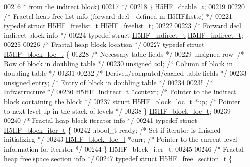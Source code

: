 \begin{DoxyCode}
00216 \textcolor{comment}{                                     * from the indirect block)}
00217 \textcolor{comment}{                                     */}
00218 \} \hyperlink{struct_h5_h_f__dtable__t}{H5HF\_dtable\_t};
00219 
00220 \textcolor{comment}{/* Fractal heap free list info (forward decl - defined in H5HFflist.c) */}
00221 \textcolor{keyword}{typedef} \textcolor{keyword}{struct }H5HF\_freelist\_t H5HF\_freelist\_t;
00222 
00223 \textcolor{comment}{/* Forward decl indirect block info */}
00224 \textcolor{keyword}{typedef} \textcolor{keyword}{struct }\hyperlink{struct_h5_h_f__indirect__t}{H5HF\_indirect\_t} \hyperlink{struct_h5_h_f__indirect__t}{H5HF\_indirect\_t};
00225 
00226 \textcolor{comment}{/* Fractal heap block location */}
00227 \textcolor{keyword}{typedef} \textcolor{keyword}{struct }\hyperlink{struct_h5_h_f__block__loc__t}{H5HF\_block\_loc\_t} \{
00228     \textcolor{comment}{/* Necessary table fields */}
00229     \textcolor{keywordtype}{unsigned}    row;            \textcolor{comment}{/* Row of block in doubling table             */}
00230     \textcolor{keywordtype}{unsigned}    col;            \textcolor{comment}{/* Column of block in doubling table          */}
00231 
00232     \textcolor{comment}{/* Derived/computed/cached table fields */}
00233     \textcolor{keywordtype}{unsigned}    entry;          \textcolor{comment}{/* Entry of block in doubling table           */}
00234 
00235     \textcolor{comment}{/* Infrastructure */}
00236     \hyperlink{struct_h5_h_f__indirect__t}{H5HF\_indirect\_t} *context;   \textcolor{comment}{/* Pointer to the indirect block containing the block */}
00237     \textcolor{keyword}{struct }\hyperlink{struct_h5_h_f__block__loc__t}{H5HF\_block\_loc\_t} *up;  \textcolor{comment}{/* Pointer to next level up in the stack of levels */}
00238 \} \hyperlink{struct_h5_h_f__block__loc__t}{H5HF\_block\_loc\_t};
00239 
00240 \textcolor{comment}{/* Fractal heap block iterator info */}
00241 \textcolor{keyword}{typedef} \textcolor{keyword}{struct }\hyperlink{struct_h5_h_f__block__iter__t}{H5HF\_block\_iter\_t} \{
00242     hbool\_t ready;              \textcolor{comment}{/* Set if iterator is finished initializing   */}
00243     \hyperlink{struct_h5_h_f__block__loc__t}{H5HF\_block\_loc\_t} *curr;     \textcolor{comment}{/* Pointer to the current level information for iterator */}
00244 \} \hyperlink{struct_h5_h_f__block__iter__t}{H5HF\_block\_iter\_t};
00245 
00246 \textcolor{comment}{/* Fractal heap free space section info */}
00247 \textcolor{keyword}{typedef} \textcolor{keyword}{struct }\hyperlink{struct_h5_h_f__free__section__t}{H5HF\_free\_section\_t} \{

\end{DoxyCode}

